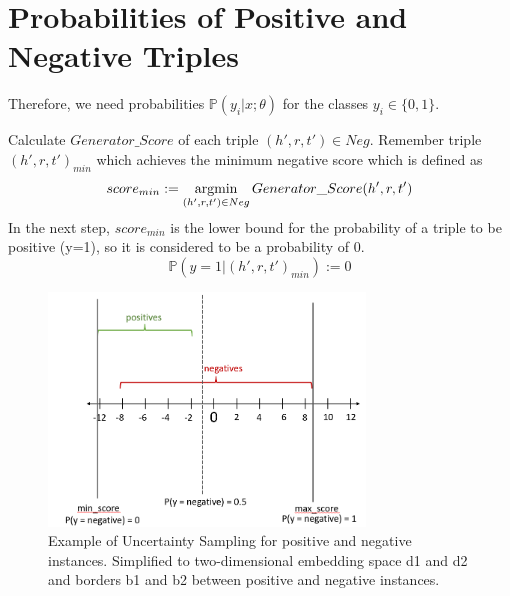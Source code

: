\section{Probabilities of Positive and Negative Triples} \label{sec:probabilities}

Therefore, we need probabilities $\mathds{P}(y_i | x; \theta)$ for the classes $y_i \in \{0, 1\}$.

Calculate $Generator\_Score$ of each triple $(h',r,t') \in Neg$.
Remember triple $(h',r,t')_{min}$ which achieves the minimum negative score which is defined as
\begin{equation}
    score_{min} := \operatorname*{argmin}_{(h', r, t') \in Neg}{Generator\_Score(h', r, t')}
\end{equation}
In the next step, $score_{min}$ is the lower bound for the probability of a triple to be positive (y=1), so it is considered to be a probability of 0.
\begin{equation}
    \mathds{P}(y = 1|(h', r, t')_{min}) := 0
\end{equation}

\begin{figure}[t]
  \centering
    \includegraphics[width=0.75\textwidth]{figures/positives_negatives1.PNG}
  \caption{Example of Uncertainty Sampling for positive and negative instances. Simplified to two-dimensional embedding space d1 and d2 and borders b1 and b2 between positive and negative instances.}
  \label{fig:informativeinstances}
\end{figure}


